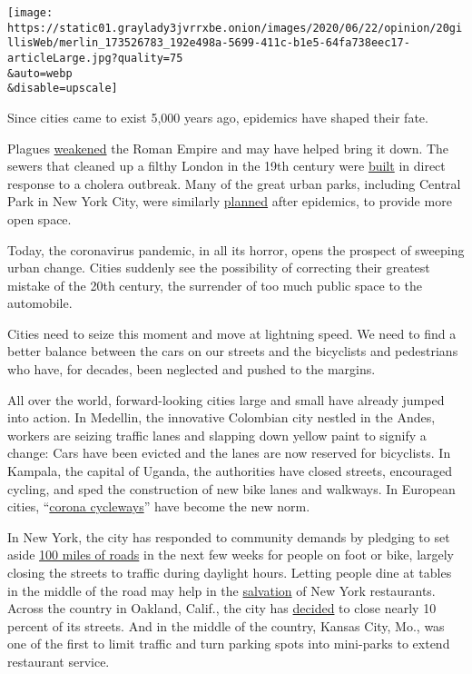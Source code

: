 \texttt{[image: https://static01.graylady3jvrrxbe.onion/images/2020/06/22/opinion/20gillisWeb/merlin\_173526783\_192e498a-5699-411c-b1e5-64fa738eec17-articleLarge.jpg?quality=75\\\&auto=webp\\\&disable=upscale]}

Since cities came to exist 5,000 years ago, epidemics have shaped their
fate.

Plagues
\href{https://www.theatlantic.com/science/archive/2016/03/plagues-roman-empire/473862/}{weakened}
the Roman Empire and may have helped bring it down. The sewers that
cleaned up a filthy London in the 19th century were
\href{http://www.bbc.co.uk/history/historic_figures/bazalgette_joseph.shtml}{built}
in direct response to a cholera outbreak. Many of the great urban parks,
including Central Park in New York City, were similarly
\href{https://www.history.com/news/cholera-pandemic-new-york-city-london-paris-green-space}{planned}
after epidemics, to provide more open space.

Today, the coronavirus pandemic, in all its horror, opens the prospect
of sweeping urban change. Cities suddenly see the possibility of
correcting their greatest mistake of the 20th century, the surrender of
too much public space to the automobile.

Cities need to seize this moment and move at lightning speed. We need to
find a better balance between the cars on our streets and the bicyclists
and pedestrians who have, for decades, been neglected and pushed to the
margins.

All over the world, forward-looking cities large and small have already
jumped into action. In Medellin, the innovative Colombian city nestled
in the Andes, workers are seizing traffic lanes and slapping down yellow
paint to signify a change: Cars have been evicted and the lanes are now
reserved for bicyclists. In Kampala, the capital of Uganda, the
authorities have closed streets, encouraged cycling, and sped the
construction of new bike lanes and walkways. In European cities,
``\href{https://www.nytimes3xbfgragh.onion/2020/06/12/business/paris-bicycles-commute-coronavirus.htmlhttps:/www.nytimes3xbfgragh.onion/2020/06/12/business/paris-bicycles-commute-coronavirus.html}{corona
cycleways}'' have become the new norm.

In New York, the city has responded to community demands by pledging to
set aside
\href{https://nyc.streetsblog.org/2020/04/27/breaking-de-blasio-commits-to-100-miles-of-open-streets/}{100
miles of roads} in the next few weeks for people on foot or bike,
largely closing the streets to traffic during daylight hours. Letting
people dine at tables in the middle of the road may help in the
\href{https://www.timeout.com/newyork/news/this-is-what-outdoor-dining-may-soon-look-like-in-nyc-052920}{salvation}
of New York restaurants. Across the country in Oakland, Calif., the city
has
\href{https://www.curbed.com/2020/5/19/21258662/oakland-slow-streets-closures-social-distancing}{decided}
to close nearly 10 percent of its streets. And in the middle of the
country, Kansas City, Mo., was one of the first to limit traffic and
turn parking spots into mini-parks to extend restaurant service.

